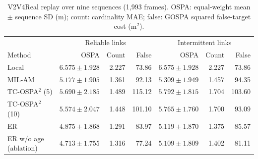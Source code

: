 \begin{table}[t]
\centering
\caption{V2V4Real replay over nine sequences (1,993 frames). OSPA: equal-weight mean $\pm$ sequence SD (m); count: cardinality MAE; false: GOSPA squared false-target cost (m$^2$).}
\label{tab:real}
\small
\begin{tabular}{lrrrrrr}
\toprule
& \multicolumn{3}{c}{Reliable links} & \multicolumn{3}{c}{Intermittent links}\\
Method & OSPA & Count & False & OSPA & Count & False\\
\midrule
Local & $6.575\pm1.928$ & 2.227 & 73.86 & $6.575\pm1.928$ & 2.227 & 73.86\\
MIL-AM & $5.177\pm1.905$ & 1.361 & 92.13 & $5.309\pm1.949$ & 1.457 & 94.35\\
TC-OSPA$^2$ (5) & $5.690\pm2.185$ & 1.489 & 115.12 & $5.792\pm1.815$ & 1.704 & 103.60\\
TC-OSPA$^2$ (10) & $5.574\pm2.047$ & 1.448 & 101.10 & $5.765\pm1.760$ & 1.700 & 93.09\\
ER & $4.875\pm1.868$ & 1.291 & 83.97 & $5.119\pm1.870$ & 1.375 & 85.57\\
\midrule
ER w/o age (ablation) & $4.713\pm1.755$ & 1.316 & 77.24 & $5.109\pm1.809$ & 1.402 & 81.11\\
\bottomrule
\end{tabular}
\end{table}
